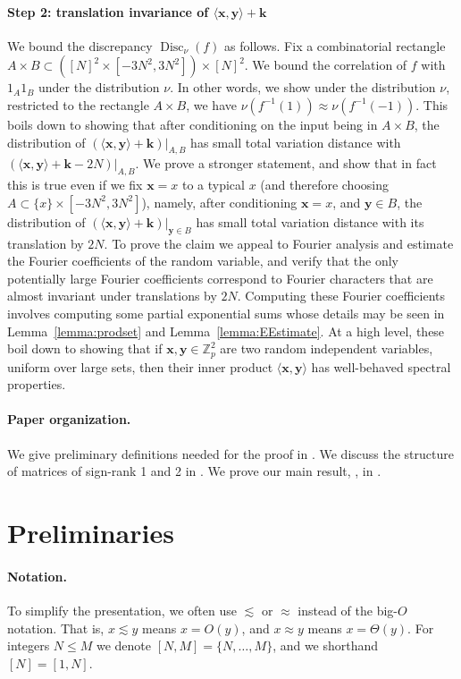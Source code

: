 \documentclass[11pt]{article}
\numberwithin{equation}{section}
\theoremstyle{definition}
\theoremstyle{plain}
\newcommand{\Z}{\mathbb Z}
\theoremstyle{definition}\newtheorem{problem}[theorem]{Problem}\theoremstyle{plain}
\DeclareMathOperator{\Disc}{Disc}
\newcommand{\x}{\mathbf{x}}
\newcommand{\y}{\mathbf{y}}
\newcommand{\Bk}{\mathbf{k}}   %
\newcommand{\ip}[1]{\langle #1 \rangle}
\begin{document}
\paragraph{Step 2: translation invariance of $\langle \x,\y\rangle+\Bk$}
We bound the discrepancy $\Disc_\nu(f)$ as follows. Fix a combinatorial rectangle $A\times B\subset ([N]^2\times [-3N^2,3N^2]) \times [N]^2$. We bound the correlation of $f$ with $1_A1_B$ under the distribution $\nu$. In other words, we show under the distribution $\nu$, restricted to the rectangle $A\times B$, we have $\nu(f^{-1}(1)) \approx \nu(f^{-1}(-1)) $.  This boils down to showing that after conditioning on the input being in $A\times B$, the distribution of $(\ip{\x,\y}+\Bk)|_{A,B}$ has small total variation distance with $(\ip{\x,\y}+\Bk-2N)|_{A,B}$. We prove a stronger  statement, and show that in fact this is true even if we fix $\x=x$ to a typical $x$ (and therefore choosing $A\subset \{x\}\times [-3N^2,3N^2]$), namely, after conditioning $\x=x$, and $\y\in B$, the distribution of $(\ip{\x,\y}+\Bk)|_{\y \in B}$  has small total variation distance with its translation by $2N$. To prove the claim  we appeal to  Fourier analysis and estimate the Fourier coefficients of the random variable, and verify that  the only potentially large Fourier coefficients correspond to Fourier characters that are almost invariant under translations by $2N$. Computing these Fourier coefficients involves computing some partial exponential sums whose details may be seen in Lemma~\ref{lemma:prodset} and Lemma~\ref{lemma:EEstimate}. At a high level, these boil down to showing that if $\x,\y \in \Z_p^2$ are two random independent variables, uniform over large sets, then their inner product $\ip{\x,\y}$ has well-behaved spectral properties.


\paragraph{Paper organization.}
We give preliminary definitions needed for the proof in .
We discuss the structure of matrices of sign-rank 1 and 2 in .
We prove our main result, , in .


\section{Preliminaries}
\label{sec:prelim}

%
\paragraph{Notation.}   %
To simplify the presentation, we often use $\lesssim$ or $\approx$ instead of the big-$O$ notation. That is, $x \lesssim y$ means $x=O(y)$, and $x \approx y$ means $x = \Theta(y)$. For integers $N \le M$ we denote $[N,M]=\{N,\ldots,M\}$, and we shorthand $[N]=[1,N]$.
\end{document}
